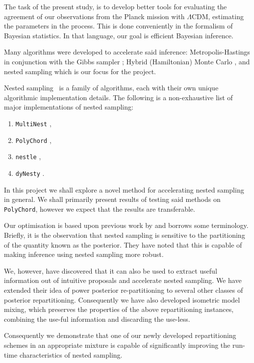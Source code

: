 \documentclass[usenatbib]{mnras}
\begin{document}
The task of the present study, is to develop better tools for
evaluating the agreement of our observations from the Planck mission
with \(\Lambda\)CDM, estimating the parameters in the process.  This
is done conveniently in the formalism of Bayesian statistics. In that
language, our goal is efficient Bayesian inference.

Many algorithms were developed to accelerate said inference:
Metropolis-Hastings \citep{Metropolis} in conjunction with the Gibbs
sampler \citep{Metropolis-Hastings-Gibbs}; Hybrid (Hamiltonian) Monte
Carlo \citep{1701.02434,Duane_1987}, and nested sampling
\citep{Skilling2006} which is our focus for the project.

Nested sampling~\cite{Skilling2006} is a family of algorithms, each
with their own unique algorithmic implementation details. The
following is a non-exhaustive list of major implementations of nested
sampling:
\begin{enumerate}
\item \texttt{MultiNest} \citep{Feroz2009MultiNestAE},
\item \texttt{PolyChord} \citep{polychord},
\item \texttt{nestle} \citep{nestle},
\item \texttt{dyNesty} \citep{Speagle_2020}.
\end{enumerate}
In this project we shall explore a novel method for accelerating
nested sampling in general. We shall primarily present results of
testing said methods on \texttt{PolyChord}, however we expect that the
results are transferable.

Our optimisation is based upon previous work by
\citeauthor{chen-ferroz-hobson} and borrows some terminology. Briefly,
it is the observation that nested sampling is sensitive to the
partitioning of the quantity known as the posterior. They have noted
that this is capable of making inference using nested sampling more
robust.

We, however, have discovered that it can also be used to extract
useful information out of intuitive proposals and accelerate nested
sampling. We have extended their idea of power posterior
re-partitioning to several other classes of posterior
repartitioning. Consequently we have also developed isometric model
mixing, which preserves the properties of the above repartitioning
instances, combining the use-ful information and discarding the
use-less.

Consequently we demonstrate that one of our newly developed
repartitioning schemes in an appropriate mixture is capable of
significantly improving the run-time characteristics of nested
sampling.
\end{document}

